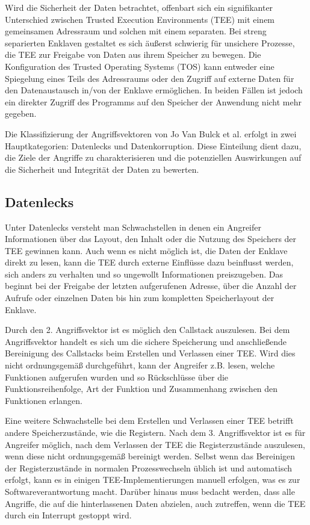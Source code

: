Wird die Sicherheit der Daten betrachtet, offenbart sich ein signifikanter Unterschied zwischen Trusted Execution Environments (TEE) mit einem gemeinsamen Adressraum und solchen mit einem separaten. Bei streng separierten Enklaven gestaltet es sich äußerst schwierig für unsichere Prozesse, die TEE zur Freigabe von Daten aus ihrem Speicher zu bewegen. Die Konfiguration des Trusted Operating Systems (TOS) kann entweder eine Spiegelung eines Teils des Adressraums oder den Zugriff auf externe Daten für den Datenaustausch in/von der Enklave ermöglichen. In beiden Fällen ist jedoch ein direkter Zugriff des Programms auf den Speicher der Anwendung nicht mehr gegeben.

Die Klassifizierung der Angriffsvektoren von Jo Van Bulck et al. erfolgt in zwei Hauptkategorien: Datenlecks und Datenkorruption. Diese Einteilung dient dazu, die Ziele der Angriffe zu charakterisieren und die potenziellen Auswirkungen auf die Sicherheit und Integrität der Daten zu bewerten.

\subsection{Datenlecks}
Unter Datenlecks versteht man Schwachstellen in denen ein Angreifer Informationen über das Layout, den Inhalt oder die Nutzung des Speichers der TEE gewinnen kann. Auch wenn es nicht möglich ist, die Daten der Enklave direkt zu lesen, kann die TEE durch externe Einflüsse dazu beinflusst werden, sich anders zu verhalten und so ungewollt Informationen preiszugeben. Das beginnt bei der Freigabe der letzten aufgerufenen Adresse, über die Anzahl der Aufrufe oder einzelnen Daten bis hin zum kompletten Speicherlayout der Enklave. 

Durch den 2. Angriffsvektor ist es möglich den Callstack auszulesen. Bei dem Angriffsvektor handelt es sich um die sichere Speicherung und anschließende Bereinigung des Callstacks beim Erstellen und Verlassen einer TEE. Wird dies nicht ordnungsgemäß durchgeführt, kann der Angreifer z.B. lesen, welche Funktionen aufgerufen wurden und so Rückschlüsse über die Funktionsreihenfolge, Art der Funktion und Zusammenhang zwischen den Funktionen erlangen. 

Eine weitere Schwachstelle bei dem Erstellen und Verlassen einer TEE betrifft andere Speicherzustände, wie die Registern. Nach dem 3. Angriffsvektor ist es für Angreifer möglich, nach dem Verlassen der TEE die Registerzustände auszulesen, wenn diese nicht ordnungsgemäß bereinigt werden. Selbst wenn das Bereinigen der Registerzustände in normalen Prozesswechseln üblich ist und automatisch erfolgt, kann es in einigen TEE-Implementierungen manuell erfolgen, was es zur Softwareverantwortung macht. Darüber hinaus muss bedacht werden, dass alle Angriffe,  die auf die hinterlassenen Daten abzielen, auch zutreffen, wenn die TEE durch ein Interrupt gestoppt wird.

